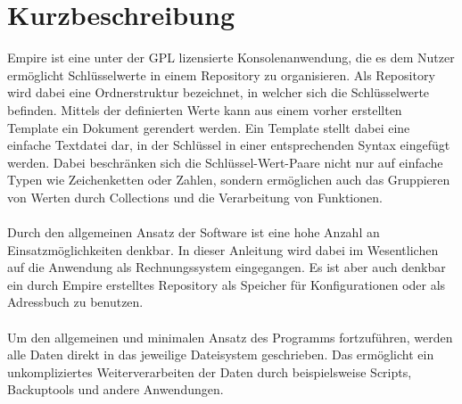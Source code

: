 
\section{Kurzbeschreibung}

Empire ist eine unter der GPL lizensierte Konsolenanwendung, die es dem Nutzer ermöglicht Schlüsselwerte in einem Repository zu organisieren.
Als Repository wird dabei eine Ordnerstruktur bezeichnet, in welcher sich die Schlüsselwerte befinden.
Mittels der definierten Werte kann aus einem vorher erstellten Template ein Dokument gerendert werden. Ein Template stellt dabei eine einfache
Textdatei dar, in der Schlüssel in einer entsprechenden Syntax eingefügt werden. Dabei beschränken sich die Schlüssel-Wert-Paare nicht nur auf einfache
Typen wie Zeichenketten oder Zahlen, sondern ermöglichen auch das Gruppieren von Werten durch Collections und die Verarbeitung von Funktionen.
\\\\
Durch den allgemeinen Ansatz der Software ist eine hohe Anzahl an Einsatzmöglichkeiten denkbar. In dieser Anleitung wird dabei im Wesentlichen
auf die Anwendung als Rechnungssystem eingegangen. Es ist aber auch denkbar ein durch Empire erstelltes Repository als Speicher für Konfigurationen
oder als Adressbuch zu benutzen.
\\\\
Um den allgemeinen und minimalen Ansatz des Programms fortzuführen, werden alle Daten direkt in das jeweilige Dateisystem geschrieben.
Das ermöglicht ein unkompliziertes Weiterverarbeiten der Daten durch beispielsweise Scripts, Backuptools und andere Anwendungen.
